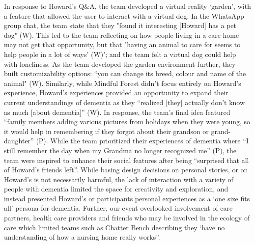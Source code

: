 In response to Howard’s Q\&A, the team developed a virtual reality ‘garden’, with a feature that allowed the user to interact with a virtual dog. In the WhatsApp group chat, the team state that they "found it interesting [Howard] has a pet dog" (W). This led to the team reflecting on how people living in a care home may not get that opportunity, but that "having an animal to care for seems to help people in a lot of ways' (W)'; and the team felt a virtual dog could help with loneliness. As the team developed the garden environment further, they built customizability options: “you can change its breed, colour and name of the animal" (W). Similarly, while Mindful Forest didn’t focus entirely on Howard’s experience, Howard’s experiences provided an opportunity to expand their current understandings of dementia as they “realized [they] actually don’t know as much [about dementia]” (W). In response, the team’s final idea featured “family members adding various pictures from holidays when they were young, so it would help in remembering if they forgot about their grandson or grand-daughter” (P). While the team prioritized their experiences of dementia where “I still remember the day when my Grandma no longer recognized me” (P),  the team were inspired to enhance their social features after being “surprised that all of Howard’s friends left”.  While basing design decisions on personal stories, or on Howard’s is not necessarily harmful, the lack of interaction with a variety of people with dementia limited the space for creativity and exploration, and instead presented Howard’s or participants personal experiences as a ‘one size fits all’ persona for dementia. Further, our event overlooked involvement of care partners, health care providers and friends who may be involved in the ecology of care which limited teams such as Chatter Bench describing they ‘have no understanding of how a nursing home really works”. 

